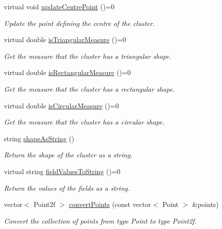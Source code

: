 \begin{DoxyCompactItemize}
virtual void \hyperlink{classmultiscale_1_1analysis_1_1SpatialCollection2D_aab860163169deb76a7e853df32902ab1}{update\-Centre\-Point} ()=0
\begin{DoxyCompactList}\small\item\em Update the point defining the centre of the cluster. \end{DoxyCompactList}\item 
virtual double \hyperlink{classmultiscale_1_1analysis_1_1SpatialCollection2D_acce0e9ddd2d92e3ba843c3015352cab5}{is\-Triangular\-Measure} ()=0
\begin{DoxyCompactList}\small\item\em Get the measure that the cluster has a triangular shape. \end{DoxyCompactList}\item 
virtual double \hyperlink{classmultiscale_1_1analysis_1_1SpatialCollection2D_a1acb28a7aafd1f75c23a94dbc988b038}{is\-Rectangular\-Measure} ()=0
\begin{DoxyCompactList}\small\item\em Get the measure that the cluster has a rectangular shape. \end{DoxyCompactList}\item 
virtual double \hyperlink{classmultiscale_1_1analysis_1_1SpatialCollection2D_a5d9967a9c531f3abe0236fbef1b0faba}{is\-Circular\-Measure} ()=0
\begin{DoxyCompactList}\small\item\em Get the measure that the cluster has a circular shape. \end{DoxyCompactList}\item 
string \hyperlink{classmultiscale_1_1analysis_1_1SpatialCollection2D_ac18243f267c777ab26bb836097a78c74}{shape\-As\-String} ()
\begin{DoxyCompactList}\small\item\em Return the shape of the cluster as a string. \end{DoxyCompactList}\item 
virtual string \hyperlink{classmultiscale_1_1analysis_1_1SpatialCollection2D_a1b70b9e25f8b82ac2195f75f89280800}{field\-Values\-To\-String} ()=0
\begin{DoxyCompactList}\small\item\em Return the values of the fields as a string. \end{DoxyCompactList}\item 
vector$<$ Point2f $>$ \hyperlink{classmultiscale_1_1analysis_1_1SpatialCollection2D_ad3d11af329d5efa9bddf40b4573ebb2c}{convert\-Points} (const vector$<$ Point $>$ \&points)
\begin{DoxyCompactList}\small\item\em Convert the collection of points from type Point to type Point2f. \end{DoxyCompactList}\end{DoxyCompactItemize}
